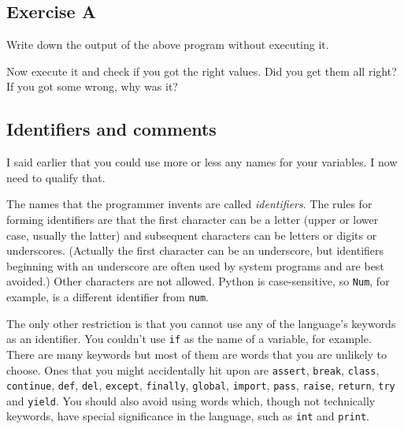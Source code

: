 
\subsection*{Exercise A}

Write down the output of the above program without executing it.


Now execute it and check if you got the right values. Did you get them
all right? If you got some wrong, why was it?


\subsection{Identifiers and comments}

I said earlier that you could use more or less any names for your variables.
I now need to qualify that.

The names that the programmer invents are called \emph{identifiers}.  The
rules for forming identifiers are that the first character can be a letter
(upper or lower case, usually the latter) and subsequent characters
can be letters or digits 
or underscores.  (Actually the first character can be an underscore, but
identifiers beginning with an underscore are often used by system programs
and are best avoided.)  Other characters are not allowed.  Python is
case-sensitive, so \verb!Num!, for example, is a different identifier from
\verb!num!.

The only other restriction is that you cannot use any of the language's keywords
as an identifier.  You couldn't use \verb!if! as the name of a variable,
for example. There are many keywords but most of them are words that you
are unlikely to choose. 
Ones that you might accidentally hit upon are
\texttt{assert}, \texttt{break}, \texttt{class}, \texttt{continue},
\texttt{def}, \texttt{del}, \texttt{except}, \texttt{finally},
\texttt{global}, \texttt{import}, \texttt{pass}, \texttt{raise},
\texttt{return}, \texttt{try} and \texttt{yield}. You should also avoid 
using words which, though not technically keywords, have special significance
in the language, such as \verb!int! and \verb!print!.

